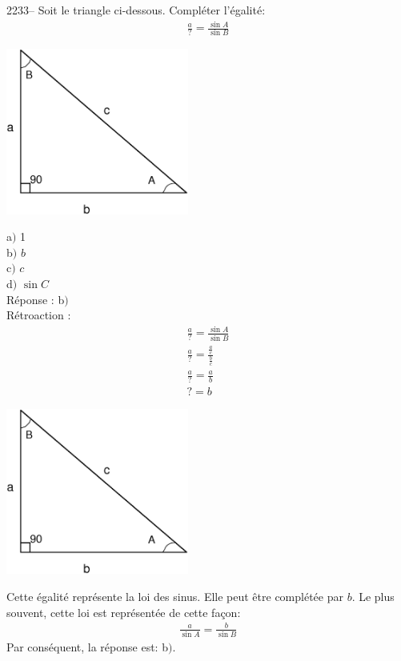 \documentclass[letterpaper, 12pt]{article}
\begin{document}
2233-- Soit le triangle ci-dessous. Compl\'eter l'\'egalit\'e:
\begin{eqnarray*}
 \frac{a}{?}=\frac{\sin{A}}{\sin{B}}
\end{eqnarray*}
\begin{center}
 \includegraphics[width=6cm,bb=14 14 580 527]{Triangle_rectangle2.eps}
\end{center}
a$)$ 1\\
b$)$ $b$\\
c$)$ $c$\\
d$)$ $\sin{C}$\\

R\'eponse : b$)$\\

R\'etroaction :\\
\begin{eqnarray*}
 \frac{a}{?}=\frac{\sin{A}}{\sin{B}}\\[2mm]
 \frac{a}{?}=\frac{\frac{a}{c}}{\frac{b}{c}}\\[2mm]
 \frac{a}{?}=\frac{a}{b}\\[2mm]
 ?=b
\end{eqnarray*}
\begin{center}
 \includegraphics[width=6cm,bb=14 14 580 527]{Triangle_rectangle2.eps}
\end{center}
Cette \'egalit\'e repr\'esente la loi des sinus. Elle peut \^etre compl\'et\'ee par $b$. Le plus souvent, cette loi est repr\'esent\'ee de cette fa\c con:
\begin{eqnarray*}
  \frac{a}{\sin{A}}=\frac{b}{\sin{B}}
\end{eqnarray*}
Par cons\'equent, la r\'eponse est: b$)$.\\
\end{document}
